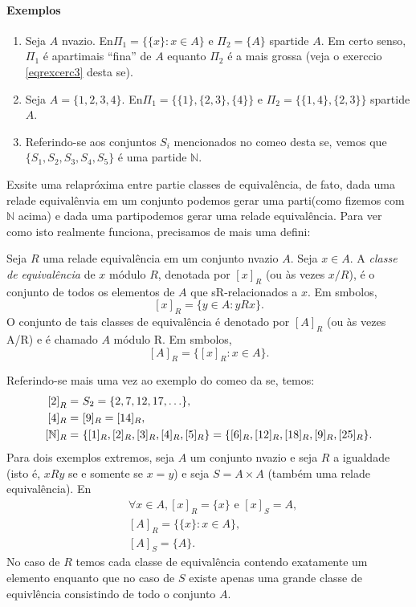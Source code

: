 \paragraph{{\bf Exemplos}}
\begin{enumerate}[{\bf 1.}]
\item\label{eqexe1} Seja $A$ n\ao vazio. En\tao $\Pi_1=\{\{x\}:x\in A\}$ e $\Pi_2=\{A\}$ s\ao parti\coes de $A$. Em certo senso, $\Pi_1$ \'e aparti\cao mais ``fina'' de $A$ equanto $\Pi_2$ \'e a mais grossa (veja o exerc\ih cio \ref{eqrexcerc3} desta se\caoi).
\item\label{eqexe2} Seja $A=\{1,2,3,4\}$. En\tao $\Pi_1=\{\{1\},\{2,3\},\{4\}\}$ e $\Pi_2=\{\{1,4\},\{2,3\}\}$ s\ao parti\cois de $A$.
\item\label{eqexe3} Referindo-se aos conjuntos $S_i$ mencionados no come\cc o desta se\caoi, vemos que $\{S_1,S_2,S_3,S_4,S_5\}$ \'e uma parti\cao de $\mathbb{N}$.
\end{enumerate}

Exsite uma rela\cao pr\'oxima entre parti\coes e classes de equival\^encia, de fato, dada uma rela\cao de equival\^envia em um conjunto podemos gerar uma parti\caoi (como fizemos com $\mathbb{N}$ acima) e dada uma parti\cao podemos gerar uma rela\cao de equival\^encia. Para ver como isto realmente funciona, precisamos de mais uma defini\caoi:
\begin{definb}
Seja $R$ uma rela\cao de equival\^encia em um conjunto n\ao vazio $A$. Seja $x\in A$. A {\it classe de equival\^encia} de $x$ m\'odulo $R$, denotada por $[x]_R$ (ou \`as vezes $x/R$), \'e o conjunto de todos os elementos de $A$ que s\ao R-relacionados a $x$. Em s\ih mbolos,
\[
[x]_R=\{y\in A: yRx\}.
\]
O conjunto de tais classes de equival\^encia \'e denotado por $[A]_R$ (ou \`as vezes A/R) e \'e chamado $A$ m\'odulo R. Em s\ih mbolos,
\[
[A]_R=\{[x]_R: x\in A\}.
\]
\end{definb}
Referindo-se mais uma vez ao exemplo do come\cc o da se\caoi, temos:
\begin{equation*}
 \begin{aligned}
{[2]}_R=&\textrm{ } S_2 = \{2,7,12,17,\ldots\},\\
[4]_R=&\textrm{ } [9]_R = [14]_R,\\
[\mathbb{N}]_R=&\textrm{ } \{[1]_R,[2]_R,[3]_R,[4]_R,[5]_R\} = \{[6]_R,[12]_R,[18]_R,[9]_R,[25]_R\}.
 \end{aligned}
\end{equation*}
Para dois exemplos extremos, seja $A$ um conjunto n\ao vazio e seja $R$ a igualdade (isto \'e, $xRy$ se e somente se $x=y$) e seja $S=A\times A$ (tamb\'em uma rela\cao de equival\^encia). En\tao
\begin{equation*}
 \begin{aligned}
&\forall x\in A, [x]_R=\{x\} \textrm { e } [x]_S=A,\\
&[A]_R=\{\{x\}:x\in A\},\\
&[A]_S=\{A\}.
 \end{aligned}
\end{equation*}
No caso de $R$ temos cada classe de equival\^encia contendo exatamente um elemento enquanto que no caso de $S$ existe apenas uma grande classe de equivl\^encia consistindo de todo o conjunto $A$.

